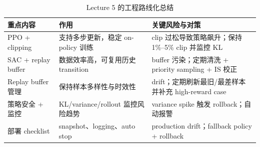 \begin{table}[H]
\centering
\begin{tabular}{p{} p{} p{}}
\toprule
重点内容 & 作用 & 关键风险与对策 \\
\midrule
PPO + clipping & 支持多步更新，稳定 on-policy 训练 & clip 过松导致策略飙升；保持 1\%--5\% clip 并监控 KL \\
SAC + replay buffer & 数据效率高，可复用历史 transition & buffer 污染；定期清洗 + priority sampling + IS 校正 \\
Replay buffer 管理 & 保持样本多样性与时效性 & drift；定期刷新最旧/最差样本并补充 high-reward case \\
策略安全 + 监控 & KL/variance/rollout 监控风险趋势 & variance spike 触发 rollback；自动报警 \\
部署 checklist & snapshot、logging、auto stop & production drift；fallback policy + rollback \\
\bottomrule
\end{tabular}
\caption{Lecture 5 的工程路线化总结}
\end{table}

